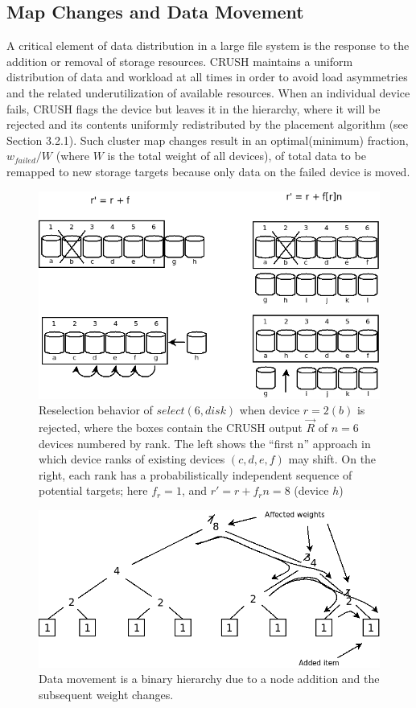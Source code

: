 \documentclass[12pt,a4paper]{report}
\begin{document}
\subsection{Map Changes and Data Movement}
A critical element of data distribution in a large file system is the response
to the addition or removal of storage resources. CRUSH maintains a uniform
distribution of data and workload at all times in order to avoid load
asymmetries and the related underutilization of available resources. When an
individual device fails, CRUSH flags the device but leaves it in the hierarchy,
where it will be rejected and its contents uniformly redistributed by the
placement algorithm (see Section 3.2.1). Such cluster map changes result in an
optimal(minimum) fraction, $w_{failed} / W$ (where $W$ is the total weight of
all devices), of total data to be remapped to new storage targets because only
data on the failed device is moved.

\begin{figure}[h!]
	\includegraphics[scale=0.60]{reselection_behavior.png}
\caption{Reselection behavior of $select(6,disk)$ when device $r = 2(b)$ is
rejected, where the boxes contain the CRUSH output $\vec{R}$ of $n = 6$ devices
numbered by rank. The left shows the ``first n'' approach in which device ranks
of existing devices $(c,d,e,f)$ may shift. On the right, each rank has a
probabilistically independent sequence of potential targets; here $f_r = 1$,
and $r' = r + f_rn = 8$ (device $h$) }
	\label{fig:reselection_behavior}
\end{figure}

\begin{figure}[h!]
	\includegraphics[scale=0.50]{data_movement.png}
\caption{Data movement is a binary hierarchy due to a node addition and the subsequent weight changes.}
	\label{fig:data_movement}
\end{figure}
\end{document}
